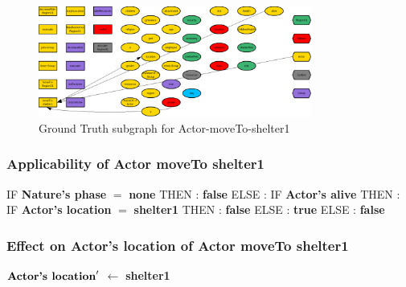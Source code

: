 \documentclass{article}%
\begin{document}
\begin{figure}[ht]%
\centering%
\includegraphics[width=0.8\textwidth]{images/Actor-moveTo-shelter1.png}%
\caption{Ground Truth subgraph for Actor{-}moveTo{-}shelter1}%
\end{figure}

%
\subsubsection{Applicability of Actor moveTo shelter1}%
\label{ssubsec:Applicability of Actor moveTo shelter1}%
\begin{flushleft}%
IF %
\textbf{Nature's phase}%
$=$%
\textbf{none}%
\linebreak%
\hspace*{2em}%
THEN %
: %
\textbf{false}%
\linebreak%
\hspace*{2em}%
ELSE %
: %
IF %
\textbf{Actor's alive}%
\linebreak%
\hspace*{4em}%
THEN %
: %
IF %
\textbf{Actor's location}%
$=$%
\textbf{shelter1}%
\linebreak%
\hspace*{6em}%
THEN %
: %
\textbf{false}%
\linebreak%
\hspace*{6em}%
ELSE %
: %
\textbf{true}%
\linebreak%
\hspace*{4em}%
ELSE %
: %
\textbf{false}%
\end{flushleft}

%
\subsubsection{Effect on Actor's location of Actor moveTo shelter1}%
\label{ssubsec:Effect on Actor's location of Actor moveTo shelter1}%
\begin{flushleft}%
$\mbox{\textbf{Actor's location}} '$%
$\leftarrow$%
\textbf{shelter1}%
\end{flushleft}
\end{document}
